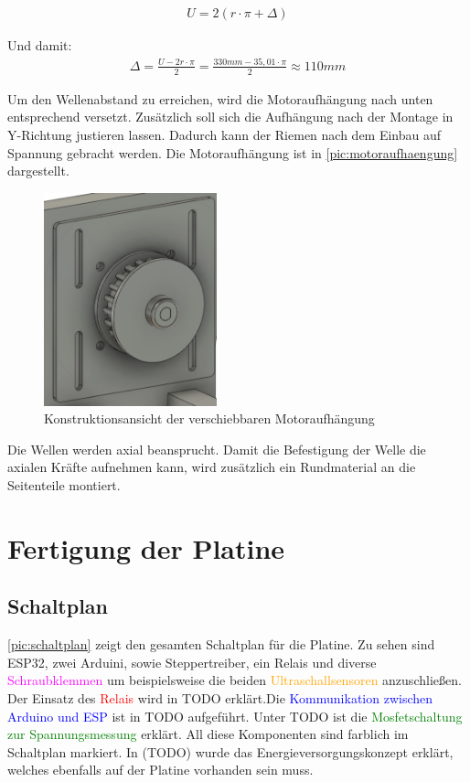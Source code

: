 \begin{align}
	U = 2 (r \cdot \pi+ \Delta) 
\end{align}

Und damit: 
\begin{align}	
	\Delta = \frac{U - 2r \cdot \pi}{2} = \frac{330mm - 35,01 \cdot \pi}{2} \approx 110mm 
\end{align}

Um den Wellenabstand zu erreichen, wird die Motoraufhängung nach unten entsprechend versetzt. Zusätzlich soll sich die Aufhängung nach der Montage in Y-Richtung justieren lassen. Dadurch kann der Riemen nach dem Einbau auf Spannung gebracht werden. Die Motoraufhängung ist in \autoref{pic:motoraufhaengung} dargestellt. 


\begin{figure}[h]
	\centering
	\includegraphics[width=5cm]{motoraufhaengung.png}
	\caption{Konstruktionsansicht der verschiebbaren Motoraufhängung}
	\label{pic:motoraufhaengung}
\end{figure}

Die Wellen werden axial beansprucht. Damit die Befestigung der Welle die axialen Kräfte aufnehmen kann, wird zusätzlich ein Rundmaterial an die Seitenteile montiert. 
\newpage

\chapter{Fertigung der Platine}
\section{Schaltplan}
\label{sec:eCardPlan}
\autoref{pic:schaltplan} zeigt den gesamten Schaltplan für die Platine. Zu sehen sind ESP32, zwei Arduini, sowie Steppertreiber, ein Relais und diverse \textcolor{magenta}{Schraubklemmen} um beispielsweise die beiden \textcolor{orange}{Ultraschallsensoren} anzuschließen. Der Einsatz des \textcolor{red}{Relais} wird in TODO erklärt.Die \textcolor{blue}{Kommunikation zwischen Arduino und ESP} ist in TODO aufgeführt. Unter TODO ist die \textcolor{green}{Mosfetschaltung zur Spannungsmessung} erklärt. All diese Komponenten sind farblich im Schaltplan markiert. In (TODO) wurde das Energieversorgungskonzept erklärt, welches ebenfalls auf der Platine vorhanden sein muss.

